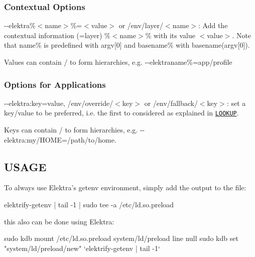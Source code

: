 \subsubsection*{Contextual Options}


\begin{DoxyItemize}
\item {\ttfamily -\/-\/elektra\%$<$name$>$\%=$<$value$>$} or {\ttfamily /env/layer/$<$name$>$}\+: Add the contextual information (=layer) {\ttfamily \%$<$name$>$\%} with its value {\ttfamily $<$value$>$}. Note that {\ttfamily name\%} is predefined with {\ttfamily argv\mbox{[}0\mbox{]}} and {\ttfamily basename\%} with {\ttfamily basename(argv\mbox{[}0\mbox{]})}.
\end{DoxyItemize}

Values can contain / to form hierarchies, e.\+g. {\ttfamily -\/-\/elektraname\%=app/profile}

\subsubsection*{Options for Applications}


\begin{DoxyItemize}
\item {\ttfamily -\/-\/elektra\+:key=value}, {\ttfamily /env/override/$<$key$>$} or {\ttfamily /env/fallback/$<$key$>$}\+: set a key/value to be preferred, i.\+e. the first to considered as explained in \href{#LOOKUP}{\tt L\+O\+O\+K\+U\+P}.
\end{DoxyItemize}

Keys can contain / to form hierarchies, e.\+g. {\ttfamily -\/-\/elektra\+:my/\+H\+O\+M\+E=/path/to/home}.

\subsection*{U\+S\+A\+G\+E}

To always use Elektra's getenv environment, simply add the output to the file\+: \begin{DoxyVerb}elektrify-getenv | tail -1 | sudo tee -a /etc/ld.so.preload
\end{DoxyVerb}


this also can be done using Elektra\+: \begin{DoxyVerb}sudo kdb mount /etc/ld.so.preload system/ld/preload line null
sudo kdb set "system/ld/preload/new"  `elektrify-getenv | tail -1`
\end{DoxyVerb}


